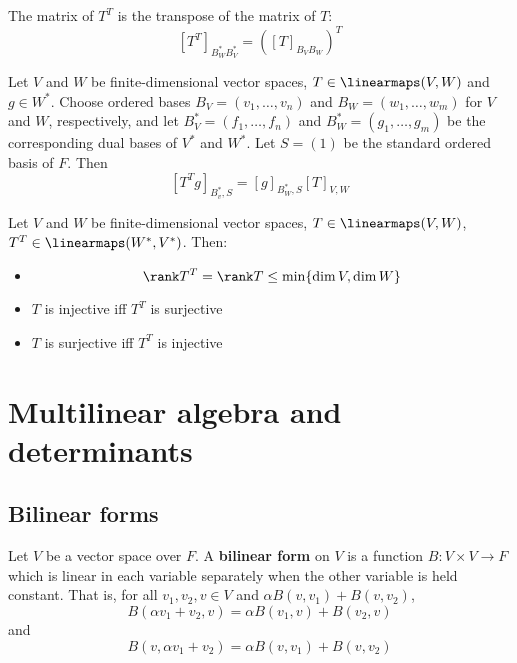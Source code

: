 \begin{theorem}
  The matrix of $T^T$ is the transpose of the matrix of $T$:
  \[
    [T^T]_{B_W^* B_V^*} = \left([T]_{B_V B_W}\right)^T
  \]
\end{theorem}

\begin{lemma}
  Let $V$ and $W$ be finite-dimensional vector spaces, $T \in \linearmaps(V, W)$ and $g \in W^*$. Choose ordered bases $B_V = (v_1, \ldots, v_n)$ and $B_W = (w_1, \ldots, w_m)$ for $V$ and $W$, respectively, and let $B_V^* = (f_1, \ldots, f_n)$ and $B_W^* = (g_1, \ldots, g_m)$ be the corresponding dual bases of $V^*$ and $W^*$. Let $S = (1)$ be the standard ordered basis of $F$. Then
  \[
    [T^T g]_{B_v^*,S} = [g]_{B_W^*, S} [T]_{V, W}
  \]
\end{lemma}

\begin{lemma}
  Let $V$ and $W$ be finite-dimensional vector spaces, $T \in \linearmaps(V, W)$, $T^T \in \linearmaps(W^*, V^*)$. Then:
  \begin{itemize}
    \item \[
      \rank T^T = \rank T \leq \min \{ \dim V, \dim W \}
    \]
    \item $T$ is injective iff $T^T$ is surjective
    \item $T$ is surjective iff $T^T$ is injective
  \end{itemize}
\end{lemma}

\section{Multilinear algebra and determinants}

\subsection{Bilinear forms}

\begin{definition}
  Let $V$ be a vector space over $F$. A \textbf{bilinear form} on $V$ is a function $B : V \times V \to F$ which is linear in each variable separately when the other variable is held constant. That is, for all $v_1, v_2, v \in V$ and $\alpha B(v, v_1) + B(v, v_2)$, 
  \[
    B(\alpha v_1 + v_2, v) = \alpha B(v_1, v) + B(v_2, v)
  \]
  and
  \[
    B(v, \alpha v_1 + v_2) = \alpha B(v, v_1) + B(v, v_2)
  \]
\end{definition}

